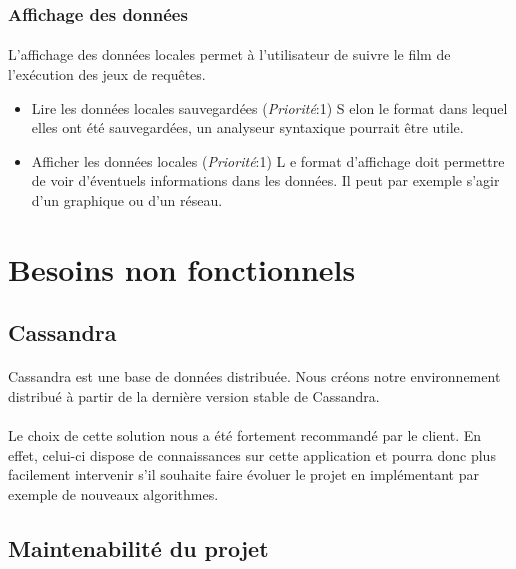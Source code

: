 \documentclass[12pt]{article}
\newenvironment{besoins}
{ \begin{itemize}[topsep=20pt]   }
{ \end{itemize}                  }
\newcommand{\priority}[1] {
  (\textit{Priorité}:#1)
}
\newcommand{\besoin}[3]{
	\item #1 \priority{#2} #3
}
\begin{document}
\subsubsection{Affichage des données}

\paragraph{} L'affichage des données locales permet à l'utilisateur de suivre le film de l'exécution des jeux de requêtes.

\begin{besoins}
 \besoin{Lire les données locales sauvegardées}{1} Selon le format dans lequel elles ont été sauvegardées, un analyseur syntaxique pourrait être utile.
 \besoin{Afficher les données locales}{1} Le format d'affichage doit permettre de voir d'éventuels informations dans les données. Il peut par exemple s'agir d'un graphique ou d'un réseau.
\end{besoins}

\newpage

\section{Besoins non fonctionnels}

\subsection{Cassandra}

\paragraph{} Cassandra est une base de données distribuée.
Nous créons notre environnement distribué à partir de la dernière version stable de Cassandra.

\paragraph{} Le choix de cette solution nous a été fortement recommandé par le client.
En effet, celui-ci dispose de connaissances sur cette application et pourra donc plus facilement intervenir s'il souhaite faire évoluer le projet en implémentant par exemple de nouveaux algorithmes.


\subsection{Maintenabilité du projet}
\end{document}
